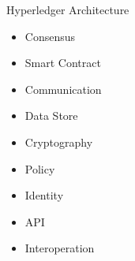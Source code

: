 \documentclass[pdf,table]{beamer}
\begin{document}
%
%


\begin{frame}{Hyperledger Architecture \cite{hyperledger:1}}
\begin{itemize}
	\item Consensus 
	\item Smart Contract 
	\item Communication
	\item Data Store
	\item Cryptography
	\item Policy
	\item Identity
	\item API
	\item Interoperation
\end{itemize}
\end{frame}
\end{document}
